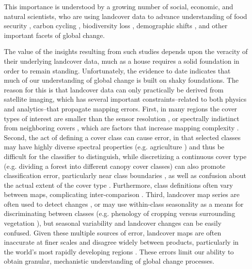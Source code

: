 \documentclass{pnastwo2}
\begin{document}
\begin{article}
This importance is understood by a growing number of social, economic, and natural scientists, who are using landcover data to advance understanding of food security \cite{lark_cropland_2015,wright_recent_2013, licker_mind_2010}, carbon cycling \cite{asner_high-resolution_2010, gaveau_major_2014}, biodiversity loss \cite{newbold_global_2015, luoto_predicting_2004}, demographic shifts \cite{linard_assessing_2010}, and other important facets of global change. 

The value of the insights resulting from such studies depends upon the veracity of their underlying landcover data, much as a house requires a solid foundation in order to remain standing. Unfortunately, the evidence to date indicates that much of our understanding of global change is built on shaky foundations. The reason for this is that landcover data can only practically be derived from satellite imaging, which has several important constraints--related to both physics and analytics--that propagate mapping errors. First, in many regions the cover types of interest are smaller than the sensor resolution \cite[e.g. smallholder's farms][]{jain_mapping_2013,debats_generalized_2015,ozdogan_resolution_2006}, or spectrally indistinct from neighboring covers \cite{sweeney_mapping_2015}, which are factors that increase mapping complexity \cite{yu_meta-discoveries_2014}. Second, the act of defining a cover class can cause error, in that selected classes may have highly diverse spectral properties (e.g. agriculture \cite{debats_generalized_2015,estes_platform_2015}) and thus be difficult for the classifier to distinguish, while discretizing a continuous cover type (e.g. dividing a forest into different canopy cover classes) can also promote classification error, particularly near class boundaries \cite{foody_status_2002}, as well as confusion about the actual extent of the cover type \cite{sexton_conservation_2015}. Furthermore, class definitions often vary between maps, complicating inter-comparison \cite{kuemmerle_challenges_2013}. Third, landcover map series are often used to detect changes \cite[e.g.][]{gross_monitoring_2013}, or may use within-class seasonality as a means for discriminating between classes (e.g. phenology of cropping versus surrounding vegetation \cite{sweeney_mapping_2015}), but seasonal variability and landcover changes can be easily confused. Given these multiple sources of error, landcover maps are often inaccurate at finer scales and disagree widely between products, particularly in the world's most rapidly developing regions \cite{estes_projected_2013, fritz_comparison_2010, fritz_cropland_2011}. These errors limit our ability to obtain granular, mechanistic understanding of global change processes. 


\end{article}
\end{document}
